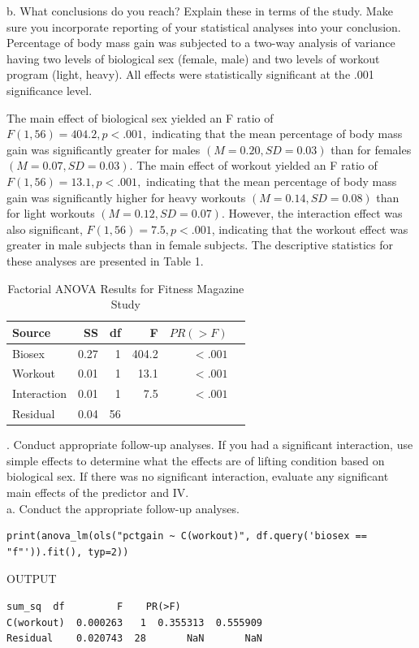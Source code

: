 \documentclass[onecolumn,10pt]{jhwhw}
\begin{document}
\noindent b. What conclusions do you reach? Explain these in terms of the study. Make sure you incorporate reporting of your statistical analyses into your conclusion.\\

Percentage of body mass gain was subjected to a two-way analysis of variance having two levels of biological sex (female, male) and two levels of workout program (light, heavy). All effects were statistically significant
at the .001 significance level.

The main effect of biological sex yielded an F ratio of $F(1, 56) = 404.2, p < .001,$ indicating that the mean percentage of body mass gain was significantly greater for males $(M = 0.20, SD = 0.03)$ than for females $(M = 0.07, SD = 0.03)$. The main effect of workout yielded an F ratio of $F(1, 56) = 13.1, p < .001,$ indicating that the mean percentage of body mass gain was significantly higher for heavy workouts $(M = 0.14, SD = 0.08)$ than for light workouts $(M = 0.12, SD = 0.07)$. However, the interaction effect was also significant, $F(1, 56) = 7.5, p < .001$, indicating that the workout effect was greater in male subjects than in female subjects. The descriptive statistics for these analyses are presented in Table 1. \\

\begin{table}[htdp]
\begin{center}
\begin{tabular}{l r r r r r}
\toprule
Source & SS & df & F & $PR(>F)$ \\
\midrule
Biosex       & 0.27 &  1  & 404.2 & $<.001$ \\
Workout      & 0.01 &  1  & 13.1  & $<.001$\\
Interaction  & 0.01 &  1  & 7.5   & $<.001$\\
Residual     & 0.04 & 56  & & \\
\bottomrule
\end{tabular}
\end{center}
\caption{Factorial ANOVA Results for Fitness Magazine Study}
\end{table}

. Conduct appropriate follow-up analyses. If you had a significant interaction, use simple effects to determine what the effects are of lifting condition based on biological sex. If there was no significant interaction, evaluate any significant main effects of the predictor and IV.
\\
\noindent a. Conduct the appropriate follow-up analyses.
\begin{lstlisting}
print(anova_lm(ols("pctgain ~ C(workout)", df.query('biosex == "f"')).fit(), typ=2))
\end{lstlisting}
\noindent OUTPUT
\begin{lstlisting}[language={}]
              sum_sq  df         F    PR(>F)
C(workout)  0.000263   1  0.355313  0.555909
Residual    0.020743  28       NaN       NaN
\end{lstlisting}
\end{document}
